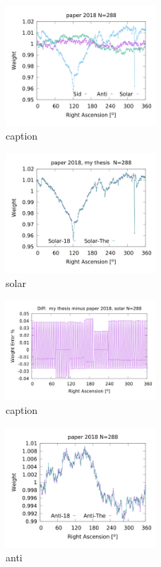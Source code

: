 \begin{figure}[H]
	\centering
	\includegraphics[width=0.5\textwidth]{solar_anti_sid_paper2018_in_288.png}
	\caption{caption}
	\label{fig:all_288_paper}
\end{figure}


\begin{figure}[H]
	\centering
	\includegraphics[width=0.5\textwidth]{solar_my_and_paper_2018_in_288.png}
	\caption{solar}
	\label{fig:solar_288}
\end{figure}


\begin{figure}[H]
	\centering
	\includegraphics[width=0.5\textwidth]{solar_my_and_paper_in_288_error.png}
	\caption{caption}
	\label{fig:error_288_solar}
\end{figure}

\begin{figure}[H]
	\centering
	\includegraphics[width=0.5\textwidth]{anti_my_and_paper_2018_in_288.png}
	\caption{anti}
	\label{fig:anti_288}
\end{figure}


